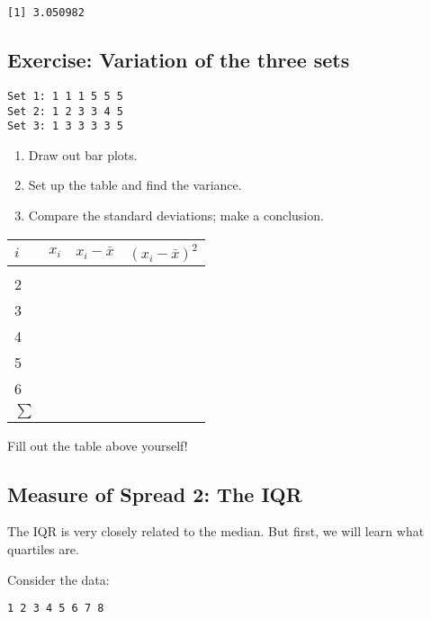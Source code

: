 \documentclass[
  letterpaper,
  DIV=11,
  numbers=noendperiod]{scrreprt}
\providecommand{\tightlist}{%
  \setlength{\itemsep}{0pt}\setlength{\parskip}{0pt}}\usepackage{longtable,booktabs,array}
\begin{document}
\begin{verbatim}
[1] 3.050982
\end{verbatim}

\hypertarget{exercise-variation-of-the-three-sets}{%
\subsection{Exercise: Variation of the three
sets}\label{exercise-variation-of-the-three-sets}}

\begin{verbatim}
Set 1: 1 1 1 5 5 5
Set 2: 1 2 3 3 4 5
Set 3: 1 3 3 3 3 5
\end{verbatim}

\begin{enumerate}
\def\labelenumi{\arabic{enumi}.}
\tightlist
\item
  Draw out bar plots.
\item
  Set up the table and find the variance.
\item
  Compare the standard deviations; make a conclusion.
\end{enumerate}

\begin{longtable}[]{@{}llll@{}}
\toprule\noalign{}
\(i\) & \(x_i\) & \(x_i - \bar x\) & \((x_i - \bar x)^2\) \\
\midrule\noalign{}
\endhead
\bottomrule\noalign{}
\endlastfoot
1 & & & \\
2 & & & \\
3 & & & \\
4 & & & \\
5 & & & \\
6 & & & \\
\(\sum\) & & & \\
\end{longtable}

Fill out the table above yourself!

\hypertarget{measure-of-spread-2-the-iqr}{%
\subsection{Measure of Spread 2: The
IQR}\label{measure-of-spread-2-the-iqr}}

The IQR is very closely related to the median. But first, we will learn
what quartiles are.

Consider the data:

\begin{verbatim}
1 2 3 4 5 6 7 8
\end{verbatim}
\end{document}
